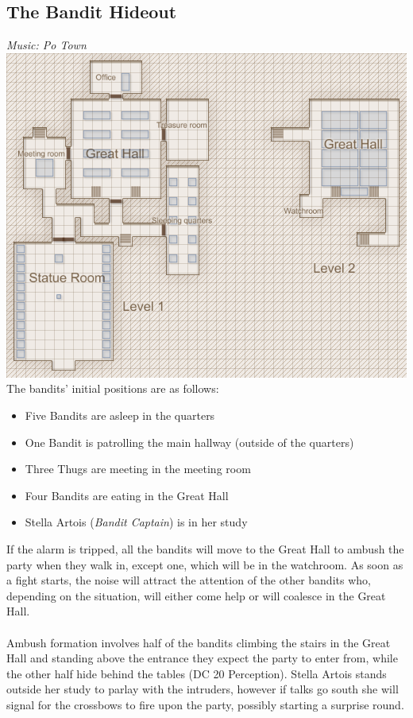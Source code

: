 \subsection{The Bandit Hideout}
\textit{Music: Po Town}\\
\includegraphics[scale=0.5]{combats/banditcave.PNG}\\
The bandits' initial positions are as follows:
\begin{itemize}
\item Five Bandits are asleep in the quarters
\item One Bandit is patrolling the main hallway (outside of the quarters)
\item Three Thugs are meeting in the meeting room
\item Four Bandits are eating in the Great Hall
\item Stella Artois (\textit{Bandit Captain}) is in her study
\end{itemize}
If the alarm is tripped, all the bandits will move to the Great Hall to ambush the party when they walk in, except one, which will be in the watchroom. As soon as a fight starts, the noise will attract the attention of the other bandits who, depending on the situation, will either come help or will coalesce in the Great Hall.\\
\\
Ambush formation involves half of the bandits climbing the stairs in the Great Hall and standing above the entrance they expect the party to enter from, while the other half hide behind the tables (DC 20 Perception). Stella Artois stands outside her study to parlay with the intruders, however if talks go south she will signal for the crossbows to fire upon the party, possibly starting a surprise round. \\
